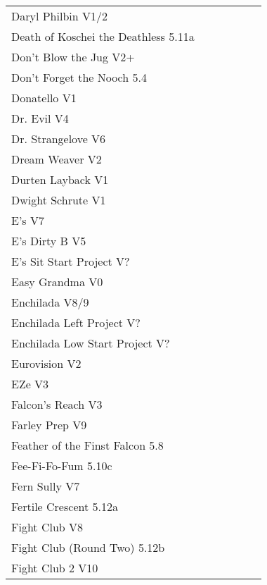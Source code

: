 \begin{flushleft}
\begin{center}
\begin{supertabular}{p{0.76\linewidth}p{0.08\linewidth}}
Daryl Philbin V1/2 & \pageref{rt:Daryl Philbin} \\
Death of Koschei the Deathless 5.11a & \pageref{rt:Death of Koschei the Deathless} \\
Don't Blow the Jug V2+ & \pageref{rt:Don't Blow the Jug} \\
Don't Forget the Nooch 5.4 & \pageref{rt:Don't Forget the Nooch} \\
Donatello V1 & \pageref{rt:Donatello} \\
Dr. Evil V4 & \pageref{rt:Dr. Evil} \\
Dr. Strangelove V6 & \pageref{rt:Dr. Strangelove} \\
Dream Weaver V2 & \pageref{vr:Dream Weaver} \\
Durten Layback V1 & \pageref{rt:Durten Layback} \\
Dwight Schrute V1 & \pageref{rt:Dwight Schrute} \\
E's V7 & \pageref{rt:E's} \\
E's Dirty B V5 & \pageref{rt:E's Dirty B} \\
E's Sit Start Project V? & \pageref{vr:E's Sit Start Project} \\
Easy Grandma V0 & \pageref{rt:Easy Grandma} \\
Enchilada V8/9 & \pageref{rt:Enchilada} \\
Enchilada Left Project V? & \pageref{vr:Enchilada Left Project} \\
Enchilada Low Start Project V? & \pageref{vr:Enchilada Low Start Project} \\
Eurovision V2 & \pageref{rt:Eurovision} \\
EZe V3 & \pageref{vr:EZe} \\
Falcon's Reach V3 & \pageref{rt:Falcon's Reach} \\
Farley Prep V9 & \pageref{rt:Farley Prep} \\
Feather of the Finst Falcon 5.8 & \pageref{rt:Feather of the Finst Falcon} \\
Fee-Fi-Fo-Fum 5.10c & \pageref{rt:Fee-Fi-Fo-Fum} \\
Fern Sully V7 & \pageref{rt:Fern Sully} \\
Fertile Crescent 5.12a & \pageref{rt:Fertile Crescent} \\
Fight Club V8 & \pageref{rt:Fight Club} \\
Fight Club (Round Two) 5.12b & \pageref{rt:Fight Club (Round Two)} \\
Fight Club 2 V10 & \pageref{rt:Fight Club 2} \\

\end{supertabular}
\end{center}
\end{flushleft}
